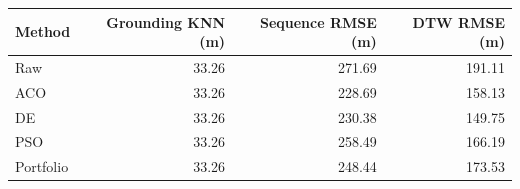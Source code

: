 \begin{tabular}{lrrr}
\toprule
Method & Grounding KNN (m) & Sequence RMSE (m) & DTW RMSE (m) \\
\midrule
Raw & 33.26 & 271.69 & 191.11 \\ 
ACO & 33.26 & 228.69 & 158.13 \\ 
DE & 33.26 & 230.38 & 149.75 \\ 
PSO & 33.26 & 258.49 & 166.19 \\ 
Portfolio & 33.26 & 248.44 & 173.53 \\ 
\bottomrule
\end{tabular}